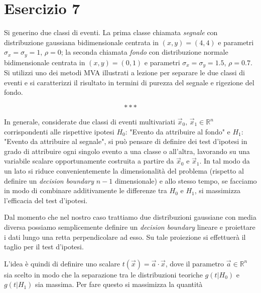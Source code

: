 \section{Esercizio 7}

\vfill

Si generino due classi di eventi. La prima classe chiamata \textsl{segnale} con distribuzione gaussiana bidimensionale centrata in $(x,y) = (4,4)$ e parametri $\sigma_x=\sigma_y=1$, $\rho=0$; la seconda chiamata \textsl{fondo} con distribuzione normale bidimensionale centrata in $(x,y) = (0,1)$ e parametri $\sigma_x=\sigma_y=1.5$, $\rho=0.7$. Si utilizzi uno dei metodi MVA illustrati a lezione per separare le due classi di eventi e si caratterizzi il risultato in termini di purezza del segnale e rigezione del fondo.

\vfill
\vfill

\[* * * \] 

\vfill
\vfill

\noindent In generale, considerate due classi di eventi multivariati $\vec{x}_0 ,\,\vec{x}_1 \in \mathbb{R}^n$ corrispondenti alle rispettive ipotesi $H_0$: "Evento da attribuire al fondo" e $H_1$: "Evento da attribuire al segnale", si può pensare di definire dei test d'ipotesi in grado di attribuire ogni singolo evento a una classe o all'altra, lavorando su una variabile scalare opportunamente costruita a partire da $\vec{x}_0 $ e $\vec{x}_1$. In tal modo da un lato si riduce convenientemente la dimensionalità del problema (rispetto al definire un \emph{decision boundary} $n-1$ dimensionale) e allo stesso tempo, se facciamo in modo di combinare additivamente le differenze tra $H_0$ e $H_1$, si massimizza l'efficacia del test d'ipotesi.\\

\vfill
\vfill

\noindent Dal momento che nel nostro caso trattiamo due distribuzioni gaussiane con media diversa possiamo semplicemente definire un  \emph{decision boundary} lineare e proiettare i dati lungo una retta perpendicolare ad esso. Su tale proiezione si effettuerà il taglio per il test d'ipotesi.\\

\vfill
\vfill

\noindent L'idea è quindi di definire uno scalare $t(\vec{x}) = \vec{a}\cdot\vec{x}$, dove il parametro $\vec{a} \in \mathbb{R}^n$ sia scelto in modo che la separazione tra le distribuzioni teoriche $g(t|H_0)$ e $g(t|H_1)$ sia massima. Per fare questo si massimizza la quantità

